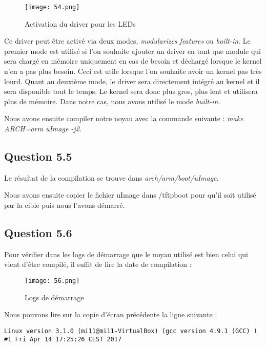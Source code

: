 \documentclass[a4paper,12pt]{report}
\begin{document}
\newpage
\begin{figure}[h]
	\centering
		\texttt{[image: 54.png]}
		\caption{Activation du driver pour les LEDs}
\end{figure}

\newpage

Ce driver peut être activé via deux modes, \textit{modularizes features} ou \textit{built-in}. Le premier mode est utilisé si l'on souhaite ajouter un driver en tant que module qui sera chargé en mémoire uniquement en cas de besoin et déchargé lorsque le kernel n'en a pas plus besoin. Ceci est utile lorsque l'on souhaite avoir un kernel pas très lourd.
Quant au deuxième mode, le driver sera directement intégré au kernel et il sera disponible tout le temps. Le kernel sera donc plus gros, plus lent et utilisera plus de mémoire.
Dans notre cas, nous avons utilisé le mode \textit{built-in}.\newline

Nous avons ensuite compiler notre noyau avec la commande suivante : \textit{make ARCH=arm uImage -j2}.

\subsection{Question 5.5}

Le résultat de la compilation se trouve dans \textit{arch/arm/boot/uImage}.

Nous avons ensuite copier le fichier uImage dans /tftpboot pour qu'il soit utilisé par la cible puis nous l'avons démarré.

\newpage

\subsection{Question 5.6}

Pour vérifier dans les logs de démarrage que le noyau utilisé est bien celui qui vient d'être compilé, il suffit de lire la date de compilation :

\begin{figure}[h]
	\centering
		\texttt{[image: 56.png]}
		\caption{Logs de démarrage}
\end{figure}

Nous pouvons lire sur la copie d'écran précédente la ligne suivante : 
\begin{verbatim}
Linux version 3.1.0 (mi11@mi11-VirtualBox) (gcc version 4.9.1 (GCC) ) 
#1 Fri Apr 14 17:25:26 CEST 2017
\end{verbatim}
\end{document}
